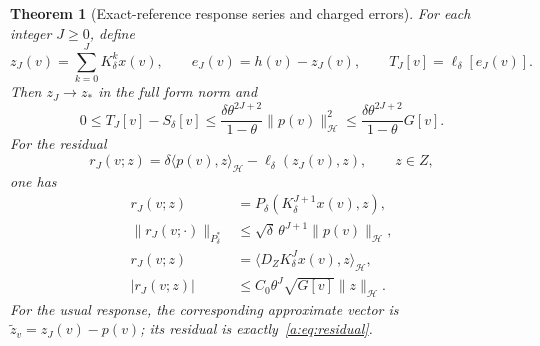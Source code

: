 \documentclass[11pt,a4paper]{article}
\numberwithin{equation}{section}
\newtheorem{theorem}{Theorem}[section]
\theoremstyle{definition}\newtheorem{definition}[theorem]{Definition}
\theoremstyle{remark}\newtheorem{remark}[theorem]{Remark}
\newcommand{\Hh}{\mathcal H}\newcommand{\Hw}{\mathcal H}
\newcommand{\ip}[2]{\langle#1,#2\rangle}\newcommand{\norm}[1]{\lVert#1\rVert}\newcommand{\abs}[1]{\lvert#1\rvert}
\begin{document}
\begin{theorem}[Exact-reference response series and charged errors]\label{a:thm:neumann}
For each integer $J\ge0$, define
\begin{equation}\label{a:eq:iterates}
 z_J(v)=\sum_{k=0}^JK_\delta^kx(v),\qquad
 e_J(v)=h(v)-z_J(v),\qquad T_J[v]=\ell_\delta[e_J(v)].
\end{equation}
Then $z_J\to z_*$ in the full form norm and
\begin{equation}\label{a:eq:Schurerror}
 0\le T_J[v]-S_\delta[v]
 \le\frac{\delta\theta^{2J+2}}{1-\theta}\norm{p(v)}_{\Hh}^2
 \le\frac{\delta\theta^{2J+2}}{1-\theta}G[v].
\end{equation}
For the residual
\begin{equation}\label{a:eq:residual}
 r_J(v;z)=\delta\ip{p(v)}z_{\Hh}-\ell_\delta(z_J(v),z),
 \qquad z\in Z,
\end{equation}
one has
\begin{align}
 r_J(v;z)&=P_\delta(K_\delta^{J+1}x(v),z),\label{a:eq:energyrow}\\
 \norm{r_J(v;\cdot)}_{P_\delta^*}
 &\le\sqrt\delta\,\theta^{J+1}\norm{p(v)}_{\Hh},\label{a:eq:energyresidual}\\
 r_J(v;z)&=\ip{D_ZK_\delta^Jx(v)}z_{\Hh},\label{a:eq:weightedrow}\\
 |r_J(v;z)|&\le C_0\theta^J\sqrt{G[v]}\norm z_{\Hh}.\label{a:eq:weightedresidual}
\end{align}
For the usual response, the corresponding approximate vector is
$\widetilde z_v=z_J(v)-p(v)$; its residual is exactly~\eqref{a:eq:residual}.
\end{theorem}
\end{document}

